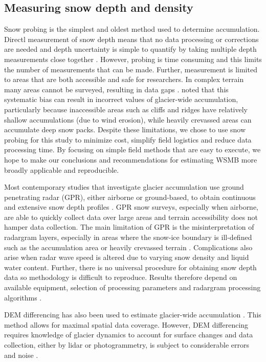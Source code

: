 \documentclass[twocolumn,letterpaper]{igs}
\begin{document}
\subsection{Measuring snow depth and density}

Snow probing is the simplest and oldest method used to determine accumulation. Directl measurement of snow depth means that no data processing or corrections are needed and depth uncertainty is simple to quantify by taking multiple depth measurements close together \citep{Sold2013}. However, probing is time consuming and this limits the number of measurements that can be made. Further, measurement is limited to areas that are both accessible and safe for researchers. In complex terrain many areas cannot be surveyed, resulting in data gaps \citep{Deems2006, Sold2014}. \cite{Sold2013} noted that this systematic bias can result in incorrect values of glacier-wide accumulation, particularly because inaccessible areas such as cliffs and ridges have relatively shallow accumulations (due to wind erosion), while heavily crevassed areas can accumulate deep snow packs. Despite these limitations, we chose to use snow probing for this study to minimize cost, simplify field logistics and reduce data processing time. By focusing on simple field methods that are easy to execute, we hope to make our conclusions and recommendations for estimating WSMB more broadly applicable and reproducible.
 
Most contemporary studies that investigate glacier accumulation use ground penetrating radar (GPR), either airborne or ground-based, to obtain continuous and extensive snow depth profiles \citep[e.g.][]{Winther1998,Machguth2006, Gusmeroli2014, McGrath2015}. GPR snow surveys, especially when airborne, are able to quickly collect data over large areas and terrain accessibility does not hamper data collection. The main limitation of GPR is the misinterpretation of radargram layers, especially in areas where the snow-ice boundary is ill-defined such as the accumulation area or heavily crevassed terrain \citep{Machguth2006, Gusmeroli2014, McGrath2015}. Complications also arise when radar wave speed is altered due to varying snow density and liquid water content. Further, there is no universal procedure for obtaining snow depth data so methodology is difficult to reproduce.  Results therefore depend on available equipment, selection of processing parameters and radargram processing algorithms \citep{Sold2013}.

DEM differencing has also been used to estimate glacier-wide accumulation \citep{Deems2006,Nolan2015}. This method allows for maximal spatial data coverage. However, DEM differencing requires knowledge of glacier dynamics to account for surface changes and data collection, either by lidar or photogrammetry, is subject to considerable errors and noise \citep{Deems2006,Nolan2015}. 
\end{document}
